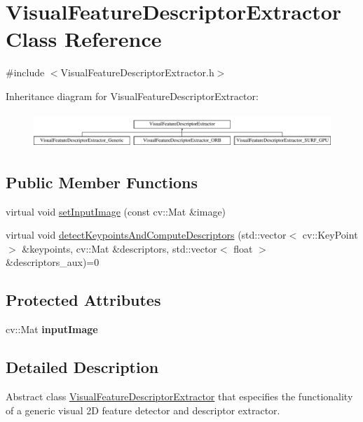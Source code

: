 \hypertarget{class_visual_feature_descriptor_extractor}{
\section{VisualFeatureDescriptorExtractor Class Reference}
\label{class_visual_feature_descriptor_extractor}
}


{\ttfamily \#include $<$VisualFeatureDescriptorExtractor.h$>$}

Inheritance diagram for VisualFeatureDescriptorExtractor:\begin{figure}[H]
\begin{center}
\leavevmode
\includegraphics[height=1.333333cm]{class_visual_feature_descriptor_extractor}
\end{center}
\end{figure}
\subsection*{Public Member Functions}
\begin{DoxyCompactItemize}
\item 
virtual void \hyperlink{class_visual_feature_descriptor_extractor_a7852b85032fb28acdc73295dbda973ff}{setInputImage} (const cv::Mat \&image)
\item 
virtual void \hyperlink{class_visual_feature_descriptor_extractor_aac4d313540ff83e03fb5b0a0952fc0f4}{detectKeypointsAndComputeDescriptors} (std::vector$<$ cv::KeyPoint $>$ \&keypoints, cv::Mat \&descriptors, std::vector$<$ float $>$ \&descriptors\_\-aux)=0
\end{DoxyCompactItemize}
\subsection*{Protected Attributes}
\begin{DoxyCompactItemize}
\item 
\hypertarget{class_visual_feature_descriptor_extractor_a1238e32b54e5a0dcbd19f89f2d4becf7}{
cv::Mat {\bfseries inputImage}}
\label{class_visual_feature_descriptor_extractor_a1238e32b54e5a0dcbd19f89f2d4becf7}

\end{DoxyCompactItemize}


\subsection{Detailed Description}
Abstract class \hyperlink{class_visual_feature_descriptor_extractor}{VisualFeatureDescriptorExtractor} that especifies the functionality of a generic visual 2D feature detector and descriptor extractor. 

